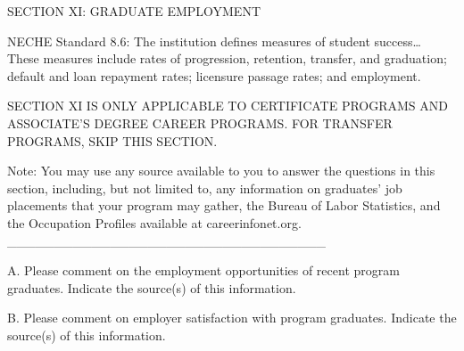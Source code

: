 SECTION XI: GRADUATE EMPLOYMENT

NECHE Standard 8.6: The institution defines measures of student success… These measures include rates of progression, retention, transfer, and graduation; default and loan repayment rates; licensure passage rates; and employment.

SECTION XI IS ONLY APPLICABLE TO CERTIFICATE PROGRAMS AND ASSOCIATE’S DEGREE CAREER PROGRAMS. FOR TRANSFER PROGRAMS, SKIP THIS SECTION.

Note: You may use any source available to you to answer the questions in this section, including, but not limited to, any information on graduates’ job placements that your program may gather, the Bureau of Labor Statistics, and the Occupation Profiles available at careerinfonet.org.
__________________________________

A. Please comment on the employment opportunities of recent program graduates. Indicate the source(s) of this information.



B. Please comment on employer satisfaction with program graduates. Indicate the source(s) of this information.


